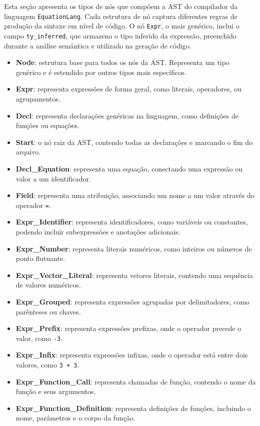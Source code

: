 Esta seção apresenta os tipos de nós que compõem a AST do compilador da linguagem \texttt{EquationLang}. Cada estrutura de nó captura diferentes regras de produção da sintaxe em nível de código. O nó \texttt{Expr}, o mais genérico, inclui o campo \verb"ty_inferred", que armazena o tipo inferido da expressão, preenchido durante a análise semântica e utilizado na geração de código.

\begin{itemize}
\item \textbf{Node}: estrutura base para todos os nós da AST. Representa um tipo genérico e é estendido por outros tipos mais específicos.

\item \textbf{Expr}: representa expressões de forma geral, como literais, operadores, ou agrupamentos.

\item \textbf{Decl}: representa declarações genéricas na linguagem, como definições de funções ou equações.

\item \textbf{Start}: o nó raiz da AST, contendo todas as declarações e marcando o fim do arquivo.

\item \textbf{Decl\_Equation}: representa uma equação, conectando uma expressão ou valor a um identificador.

\item \textbf{Field}: representa uma atribuição, associando um nome a um valor através do operador \texttt{=}.

\item \textbf{Expr\_Identifier}: representa identificadores, como variáveis ou constantes, podendo incluir subexpressões e anotações adicionais.

\item \textbf{Expr\_Number}: representa literais numéricos, como inteiros ou números de ponto flutuante.

\item \textbf{Expr\_Vector\_Literal}: representa vetores literais, contendo uma sequência de valores numéricos.

\item \textbf{Expr\_Grouped}: representa expressões agrupadas por delimitadores, como parênteses ou chaves.

\item \textbf{Expr\_Prefix}: representa expressões prefixas, onde o operador precede o valor, como \texttt{-3}.

\item \textbf{Expr\_Infix}: representa expressões infixas, onde o operador está entre dois valores, como \texttt{3 + 3}.

\item \textbf{Expr\_Function\_Call}: representa chamadas de função, contendo o nome da função e seus argumentos.

\item \textbf{Expr\_Function\_Definition}: representa definições de funções, incluindo o nome, parâmetros e o corpo da função.
\end{itemize}

